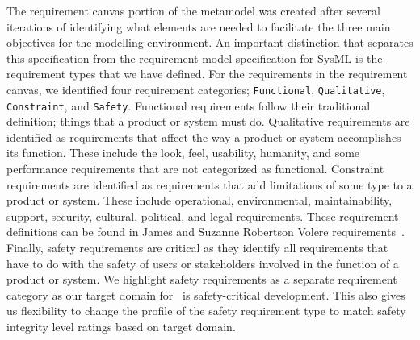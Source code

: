 
The requirement canvas portion of the metamodel was created after several iterations of identifying what elements are needed to facilitate the three main objectives for the modelling environment. An important distinction that separates this specification from the requirement model specification for SysML is the requirement types that we have defined. For the requirements in the requirement canvas, we identified four requirement categories; \texttt{Functional}, \texttt{Qualitative}, \texttt{Constraint}, and \texttt{Safety}. Functional requirements follow their traditional definition; things that a product or system must do. Qualitative requirements are identified as requirements that affect the way a product or system accomplishes its function. These include the look, feel, usability, humanity, and some performance requirements that are not categorized as functional. Constraint requirements are identified as requirements that add limitations of some type to a product or system. These include operational, environmental, maintainability, support, security, cultural, political, and legal requirements. These requirement definitions can be found in James and Suzanne Robertson Volere requirements~\cite{robertson2000volere}. Finally, safety requirements are critical as they identify all requirements that have to do with the safety of users or stakeholders involved in the function of a product or system. We highlight safety requirements as a separate requirement category as our target domain for \tool\ is safety-critical development. This also gives us flexibility to change the profile of the safety requirement type to match safety integrity level ratings based on target domain.

